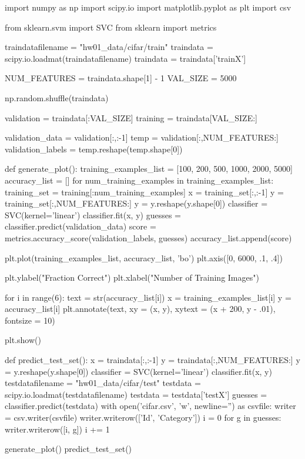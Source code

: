 \documentclass[11pt]{article}
\begin{document}
\begin{python}
import numpy as np
import scipy.io
import matplotlib.pyplot as plt
import csv

from sklearn.svm import SVC
from sklearn import metrics

traindatafilename = "hw01_data/cifar/train"
traindata = scipy.io.loadmat(traindatafilename)
traindata = traindata['trainX']

NUM_FEATURES = traindata.shape[1] - 1
VAL_SIZE = 5000

np.random.shuffle(traindata)

validation = traindata[:VAL_SIZE]
training = traindata[VAL_SIZE:]

validation_data = validation[:,:-1]
temp = validation[:,NUM_FEATURES:]
validation_labels = temp.reshape(temp.shape[0])

def generate_plot():
    training_examples_list = [100, 200, 500, 1000, 2000, 5000]
    accuracy_list = []
    for num_training_examples in training_examples_list:
        training_set = training[:num_training_examples]
        x = training_set[:,:-1]
        y = training_set[:,NUM_FEATURES:]
        y = y.reshape(y.shape[0])
        classifier = SVC(kernel='linear')
        classifier.fit(x, y)
        guesses = classifier.predict(validation_data)
        score = metrics.accuracy_score(validation_labels, guesses)
        accuracy_list.append(score)

    plt.plot(training_examples_list, accuracy_list, 'bo')
    plt.axis([0, 6000, .1, .4])

    plt.ylabel("Fraction Correct")
    plt.xlabel("Number of Training Images")

    for i in range(6):
        text = str(accuracy_list[i])
        x = training_examples_list[i]
        y = accuracy_list[i]
        plt.annotate(text, xy = (x, y), xytext = (x + 200, y - .01), fontsize = 10)

    plt.show()

def predict_test_set():
    x = traindata[:,:-1]
    y = traindata[:,NUM_FEATURES:]
    y = y.reshape(y.shape[0])
    classifier = SVC(kernel='linear')
    classifier.fit(x, y)
    testdatafilename = "hw01_data/cifar/test"
    testdata = scipy.io.loadmat(testdatafilename)
    testdata = testdata['testX']
    guesses = classifier.predict(testdata)
    with open('cifar.csv', 'w', newline='') as csvfile:
        writer = csv.writer(csvfile)
        writer.writerow(['Id', 'Category'])
        i = 0
        for g in guesses:
            writer.writerow([i, g])
            i += 1

generate_plot()
 	predict_test_set()

\end{python}
\end{document}
